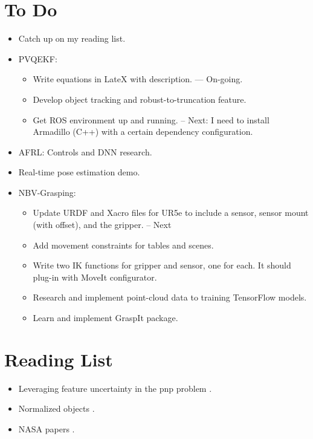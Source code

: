 \documentclass[11pt]{article}
\begin{document}
\section{To Do}
\begin{itemize}
  \item Catch up on my reading list.
  \item PVQEKF:
  \begin{itemize}
      \item Write equations in LateX with description. --- On-going.
      \item Develop object tracking and robust-to-truncation feature.
      \item Get ROS environment up and running. -- Next: I need to install Armadillo (C++) with a certain dependency configuration.
  \end{itemize}
  \item AFRL: Controls and DNN research.
  \item Real-time pose estimation demo.
  \item NBV-Grasping:
      \begin{itemize}
      \item Update URDF and Xacro files for UR5e to include a sensor, sensor mount (with offset), and the gripper. -- Next
      \item Add movement constraints for tables and scenes.
      \item Write two IK functions for gripper and sensor, one for each. It should plug-in with MoveIt configurator.
      \item Research and implement point-cloud data to training TensorFlow models.
      \item Learn and implement GraspIt package.
      \end{itemize}
\end{itemize}

\section{Reading List}
\begin{itemize}
      \item Leveraging feature uncertainty in the pnp problem \cite{ferraz2014leveraging}.
      \item Normalized objects \cite{Wang_2019_CVPR}.
      \item NASA papers \cite{NASATech44:online}.
\end{itemize}
\end{document}

